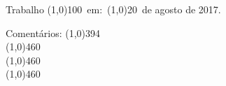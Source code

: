 \documentclass[
	12pt,				%
	openright,			%
	twoside,			%
	a4paper,			%
	english,			%
	french,				%
	spanish,			%
	brazil				%
	]{abntex2}
\begin{document}

%
% 
%
\begin{folhadeaprovacao}

  \begin{center}
    {\ABNTEXchapterfont\large\imprimirautor}

    \vspace*{\fill}\vspace*{\fill}
    \begin{center}
      \ABNTEXchapterfont\bfseries\Large\imprimirtitulo
    \end{center}
    \vspace*{\fill}
    
    \hspace{.45\textwidth}
    \begin{minipage}{.5\textwidth}
        \imprimirpreambulo
    \end{minipage}%
    \vspace*{\fill}
   \end{center}

   \begin{center}
     Trabalho \line(1,0){100}~em:~\line(1,0){20}~de agosto de 2017.
   \end{center}


   
   
   \vspace{1.5cm}
   \noindent
   Comentários: \line(1,0){394} \\
   \line(1,0){460} \\
   \line(1,0){460} \\
   \line(1,0){460}
      
   \begin{center}
    \vspace*{0.5cm}
    {\large\imprimirlocal}
    \par
    {\large\imprimirdata}
    \vspace*{1cm}
  \end{center}
  
\end{folhadeaprovacao}
\end{document}

